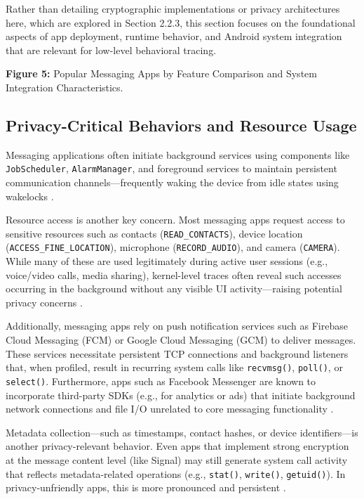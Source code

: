 \documentclass[a4paper,12pt]{report}
\begin{document}
Rather than detailing cryptographic implementations or privacy architectures here, which are explored in Section 2.2.3, this section focuses on the foundational aspects of app deployment, runtime behavior, and Android system integration that are relevant for low-level behavioral tracing.

\textbf{Figure 5:} Popular Messaging Apps by Feature Comparison and System Integration Characteristics.

\subsection{Privacy-Critical Behaviors and Resource Usage}
Messaging applications often initiate background services using components like \texttt{JobScheduler}, \texttt{AlarmManager}, and foreground services to maintain persistent communication channels—frequently waking the device from idle states using wakelocks \cite{androidwakelocks}.

Resource access is another key concern. Most messaging apps request access to sensitive resources such as contacts (\texttt{READ\_CONTACTS}), device location (\texttt{ACCESS\_FINE\_LOCATION}), microphone (\texttt{RECORD\_AUDIO}), and camera (\texttt{CAMERA}). While many of these are used legitimately during active user sessions (e.g., voice/video calls, media sharing), kernel-level traces often reveal such accesses occurring in the background without any visible UI activity—raising potential privacy concerns \cite{reardon2019leakage}.

Additionally, messaging apps rely on push notification services such as Firebase Cloud Messaging (FCM) or Google Cloud Messaging (GCM) to deliver messages. These services necessitate persistent TCP connections and background listeners that, when profiled, result in recurring system calls like \texttt{recvmsg()}, \texttt{poll()}, or \texttt{select()}. Furthermore, apps such as Facebook Messenger are known to incorporate third-party SDKs (e.g., for analytics or ads) that initiate background network connections and file I/O unrelated to core messaging functionality \cite{pi2018metadata}.

Metadata collection—such as timestamps, contact hashes, or device identifiers—is another privacy-relevant behavior. Even apps that implement strong encryption at the message content level (like Signal) may still generate system call activity that reflects metadata-related operations (e.g., \texttt{stat()}, \texttt{write()}, \texttt{getuid()}). In privacy-unfriendly apps, this is more pronounced and persistent \cite{signalprivacy2016}.
\end{document}
